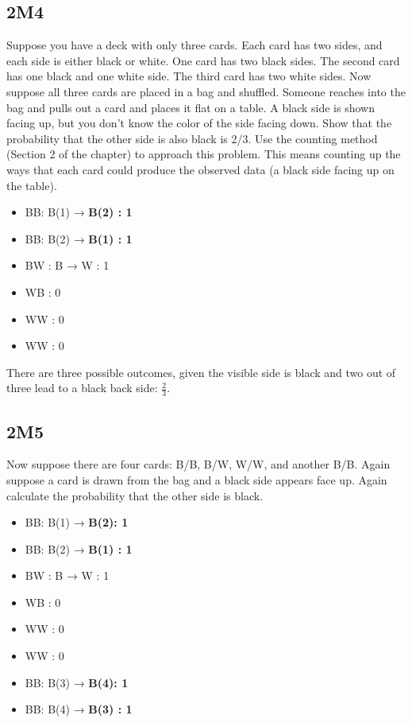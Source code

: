 \documentclass[
]{book}
\providecommand{\tightlist}{%
  \setlength{\itemsep}{0pt}\setlength{\parskip}{0pt}}
\begin{document}
\hypertarget{m4}{%
\subsection*{2M4}\label{m4}}

Suppose you have a deck with only three cards. Each card has two sides, and each side is either black or white. One card has two black sides. The second card has one black and one white side. The third card has two white sides. Now suppose all three cards are placed in a bag and shuffled. Someone reaches into the bag and pulls out a card and places it flat on a table. A black side is shown facing up, but you don't know the color of the side facing down. Show that the probability that the other side is also black is 2/3. Use the counting method (Section 2 of the chapter) to approach this problem. This means counting up the ways that each card could produce the observed data (a black side facing up on the table).

\begin{itemize}
\tightlist
\item
  B\textbar B: B(1) → \textbf{B(2) : 1}
\item
  B\textbar B: B(2) → \textbf{B(1) : 1}
\item
  B\textbar W : B → W : 1
\item
  W\textbar B : 0
\item
  W\textbar W : 0
\item
  W\textbar W : 0
\end{itemize}

There are three possible outcomes, given the visible side is black and two out of three lead to a black back side: \(\frac{2}{3}\).

\hypertarget{m5}{%
\subsection*{2M5}\label{m5}}

Now suppose there are four cards: B/B, B/W, W/W, and another B/B. Again suppose a card is drawn from the bag and a black side appears face up. Again calculate the probability that the other side is black.

\begin{itemize}
\tightlist
\item
  B\textbar B: B(1) → \textbf{B(2): 1}
\item
  B\textbar B: B(2) → \textbf{B(1) : 1}
\item
  B\textbar W : B → W : 1
\item
  W\textbar B : 0
\item
  W\textbar W : 0
\item
  W\textbar W : 0
\item
  B\textbar B: B(3) → \textbf{B(4): 1}
\item
  B\textbar B: B(4) → \textbf{B(3) : 1}
\end{itemize}
\end{document}
